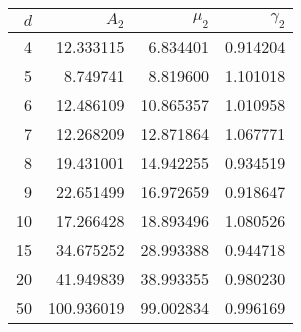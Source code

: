 \begin{tabular}{rrrr}
\toprule
 $d$ &       $A_2$ &    $\mu_2$ &  $\gamma_2$ \\
\midrule
   4 &   12.333115 &   6.834401 &    0.914204 \\
   5 &    8.749741 &   8.819600 &    1.101018 \\
   6 &   12.486109 &  10.865357 &    1.010958 \\
   7 &   12.268209 &  12.871864 &    1.067771 \\
   8 &   19.431001 &  14.942255 &    0.934519 \\
   9 &   22.651499 &  16.972659 &    0.918647 \\
  10 &   17.266428 &  18.893496 &    1.080526 \\
  15 &   34.675252 &  28.993388 &    0.944718 \\
  20 &   41.949839 &  38.993355 &    0.980230 \\
  50 &  100.936019 &  99.002834 &    0.996169 \\
\bottomrule
\end{tabular}
